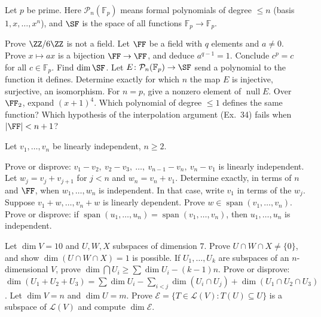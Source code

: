 \documentclass[11pt]{scrartcl}
\DeclareMathOperator{\nul}{null}
\DeclareMathOperator{\spn}{span}
\newcommand{\LL}{\mathcal L}
\newcommand{\PP}{\mathcal P}
\newcommand{\Fp}{\mathbb F_p}
\begin{document}
\begin{problem}
  Let $p$ be prime. Here $\PP_n(\Fp)$ means formal polynomials of degree $\le n$ (basis $1,x,\dots,x^n$), and $\SF$ is the space of all functions $\Fp\to\Fp$.
  \begin{enumerate}[(a)]
    \ii Prove $\ZZ/6\ZZ$ is not a field.
    \ii Let $\FF$ be a field with $q$ elements and $a\ne0$.
    Prove $x\mapsto ax$ is a bijection $\FF\to\FF$, and deduce $a^{q-1}=1$.
    Conclude $c^p=c$ for all $c\in\Fp$.
    \ii Find $\dim\SF$.
    Let $E\colon\PP_n(\Fp)\to\SF$ send a polynomial to the function it defines.
    Determine exactly for which $n$ the map $E$ is injective, surjective, an isomorphism.
    For $n=p$, give a nonzero element of $\nul E$.
    \ii Over $\FF_2$, expand $(x+1)^4$.
    Which polynomial of degree $\le 1$ defines the same function?
    Which hypothesis of the interpolation argument (Ex.~34) fails when $|\FF|<n+1$?
  \end{enumerate}
\end{problem}

\begin{problem}
  Let $v_1,\dots,v_n$ be linearly independent, $n\ge2$.
  \begin{enumerate}[(a)]
    \ii Prove or disprove: $v_1-v_2,\ v_2-v_3,\ \dots,\ v_{n-1}-v_n,\ v_n-v_1$ is linearly independent.
    \ii Let $w_j=v_j+v_{j+1}$ for $j<n$ and $w_n=v_n+v_1$.
    Determine exactly, in terms of $n$ and $\FF$, when $w_1,\dots,w_n$ is independent.
    In that case, write $v_1$ in terms of the $w_j$.
    \ii Suppose $v_1+w,\dots,v_n+w$ is linearly dependent. Prove $w\in\spn(v_1,\dots,v_n)$.
    \ii Prove or disprove: if $\spn(u_1,\dots,u_n)=\spn(v_1,\dots,v_n)$, then $u_1,\dots,u_n$ is independent.
  \end{enumerate}
\end{problem}

\begin{problem}
  \leavevmode
  \begin{enumerate}[(a)]
    \ii Let $\dim V=10$ and $U,W,X$ subspaces of dimension $7$.
    Prove $U\cap W\cap X\ne\{0\}$, and show $\dim(U\cap W\cap X)=1$ is possible.
    \ii If $U_1,\dots,U_k$ are subspaces of an $n$-dimensional $V$, prove $\dim\bigcap U_i\ge\sum\dim U_i-(k-1)n$.
    \ii Prove or disprove: $\dim(U_1+U_2+U_3)=\sum\dim U_i-\sum_{i<j}\dim(U_i\cap U_j)+\dim(U_1\cap U_2\cap U_3)$.
    \ii Let $\dim V=n$ and $\dim U=m$.
    Prove $\mathcal E=\{T\in\LL(V):T(U)\subseteq U\}$ is a subspace of $\LL(V)$ and compute $\dim\mathcal E$.
  \end{enumerate}
\end{problem}
\end{document}
